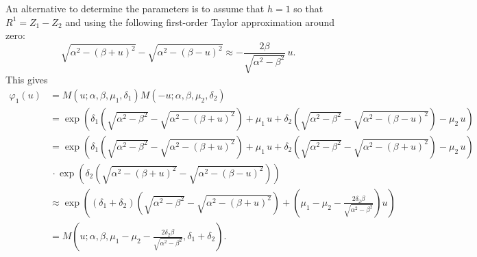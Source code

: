 An alternative to determine the parameters is to assume that $h=1$ so
that $R^1 = Z_1 - Z_2$ and using the following first-order Taylor
approximation around zero: 
\begin{equation*}
  \sqrt{\alpha^2 -
    (\beta + u)^2}-\sqrt{\alpha^2 - (\beta - u)^2} \approx
  -\frac{2\beta}{\sqrt{\alpha^2 - \beta^2}}\, u. 
\end{equation*}
This gives 
\begin{align*}
  \varphi_1(u)
  &= M(u; \alpha, \beta, \mu_1, \delta_1) M(-u; \alpha, \beta, \mu_2,
    \delta_2) \\
  &= \exp\left(\delta_1 (\sqrt{\alpha^2-\beta^2} - \sqrt{\alpha^2 -
    (\beta+u)^2}) + \mu_1 \, u + \delta_2 (\sqrt{\alpha^2 - \beta^2} -
    \sqrt{\alpha^2 - (\beta - u)^2}) - \mu_2\, u\right)\\
  &= \exp\left(\delta_1 (\sqrt{\alpha^2-\beta^2} - \sqrt{\alpha^2 -
    (\beta+u)^2}) + \mu_1 \, u + \delta_2 (\sqrt{\alpha^2 - \beta^2} -
    \sqrt{\alpha^2 - (\beta + u)^2})  - \mu_2\, u\right)\\
  &\, \cdot \exp\left(\delta_2( \sqrt{\alpha^2 -
    (\beta + u)^2}-\sqrt{\alpha^2 - (\beta - u)^2})\right)\\
  &\approx \exp\left((\delta_1+\delta_2) (\sqrt{\alpha^2-\beta^2} -
    \sqrt{\alpha^2-(\beta+u)^2}) + \left(\mu_1-\mu_2
    -\frac{2\delta_2\beta}{\sqrt{\alpha^2-\beta^2}}\right) u\right)\\ 
  &= M\left(u; \alpha, \beta, \mu_1-\mu_2
    -\frac{2\delta_2\beta}{\sqrt{\alpha^2-\beta^2}},
    \delta_1+\delta_2\right). 
\end{align*}



